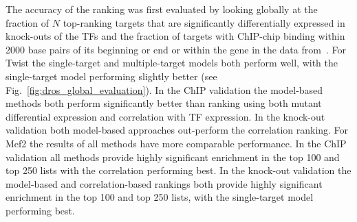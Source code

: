 \documentclass{pnastwo}
\begin{document}
\begin{article}
The accuracy of the ranking was first evaluated by looking globally at the fraction of $N$ top-ranking targets that are significantly differentially expressed in knock-outs of the TFs and the fraction
of targets with ChIP-chip binding within 2000 base
pairs of its beginning or end or within the gene in the data
from~\cite{Zinzen2009}. For Twist the single-target and multiple-target models both perform well, with the single-target model performing slightly better (see Fig.~\ref{fig:dros_global_evaluation}). In the ChIP validation the model-based methods both perform significantly better than ranking using both mutant differential expression and correlation with TF expression. In the knock-out validation both model-based approaches out-perform the correlation ranking. For Mef2 the results of all methods have more comparable performance. In the ChIP validation all methods provide highly significant enrichment in the top 100 and top 250 lists with the correlation performing best. In the knock-out validation the model-based and correlation-based rankings both provide highly significant enrichment in the top 100 and top 250 lists, with the single-target model performing best.


\end{article}
\end{document}
